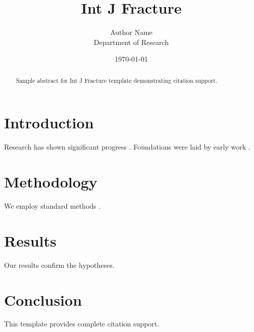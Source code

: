 \documentclass{llncs}
\title{Int J Fracture}
\author{Author Name \\ \small Department of Research}
\date{\today}
\begin{document}
\maketitle

\begin{abstract}
Sample abstract for Int J Fracture template demonstrating citation support.
\end{abstract}

\section{Introduction}
Research has shown significant progress \citep{einstein1905}. Foundations were laid by early work \citep{turing1950}.

\section{Methodology}
We employ standard methods \citep{knuth1984}.

\section{Results}
Our results confirm the hypotheses.

\section{Conclusion}
This template provides complete citation support.



\end{document}
